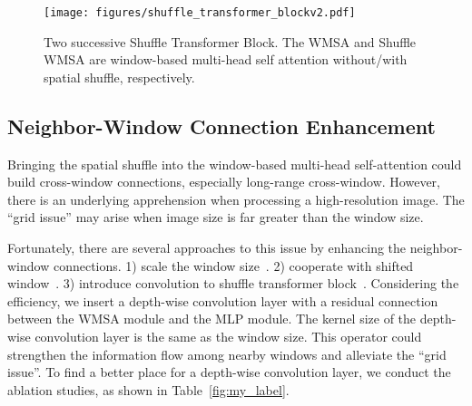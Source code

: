 \documentclass{article}
\begin{document}
\begin{figure*}[!t]
    \centering
    \texttt{[image: figures/shuffle\_transformer\_blockv2.pdf]}
    \caption{Two successive Shuffle Transformer Block. The WMSA and Shuffle WMSA are window-based multi-head self attention without/with spatial shuffle, respectively.
    }
    \label{fig:shuffle_transformer_block}
    \vspace{0mm}
\end{figure*}

\subsection{Neighbor-Window Connection Enhancement}
Bringing the spatial shuffle into the window-based multi-head self-attention could build cross-window connections, especially long-range cross-window. However, there is an underlying apprehension when processing a high-resolution image. The ``grid issue'' may arise when image size is far greater than the window size. 

Fortunately, there are several approaches to this issue by enhancing the neighbor-window connections. 1) scale the window size~\cite{vaswani2021scaling}. 2) cooperate with shifted window~\cite{liu2021Swin}. 3) introduce convolution to shuffle transformer block~\cite{li2021localvit,wu2021cvt}. Considering the efficiency, we insert a depth-wise convolution layer with a residual connection between the WMSA module and the MLP module. The kernel size of the depth-wise convolution layer is the same as the window size. This operator could strengthen the information flow among nearby windows and alleviate the ``grid issue''. To find a better place for a depth-wise convolution layer, we conduct the ablation studies, as shown in Table~\ref{fig:my_label}.
\end{document}
